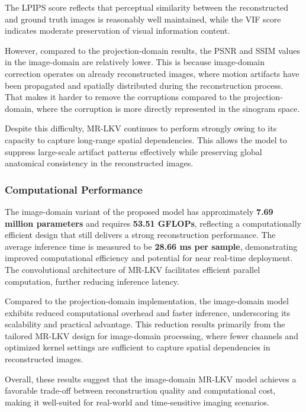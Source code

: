The LPIPS score reflects that perceptual similarity between the reconstructed and ground truth images is reasonably well maintained, while the VIF score indicates moderate preservation of visual information content.

However, compared to the projection-domain results, the PSNR and SSIM values in the image-domain are relatively lower. This is because image-domain correction operates on already reconstructed images, where motion artifacts have been propagated and spatially distributed during the reconstruction process. That makes it harder to remove the corruptions compared to the projection-domain, where the corruption is more directly represented in the sinogram space.

Despite this difficulty, MR-LKV continues to perform strongly owing to its capacity to capture long-range spatial dependencies. This allows the model to suppress large-scale artifact patterns effectively while preserving global anatomical consistency in the reconstructed images.

 

\subsubsection{Computational Performance}
The image-domain variant of the proposed model has approximately \textbf{7.69 million parameters} and requires \textbf{53.51 GFLOPs}, reflecting a computationally efficient design that still delivers a strong reconstruction performance. The average inference time is measured to be \textbf{28.66 ms per sample}, demonstrating improved computational efficiency and potential for near real-time deployment.  The convolutional architecture of MR-LKV facilitates efficient parallel computation, further reducing inference latency.


Compared to the projection-domain implementation, the image-domain model exhibits reduced computational overhead and faster inference, underscoring its scalability and practical advantage. This reduction results primarily from the tailored MR-LKV design for image-domain processing, where fewer channels and optimized kernel settings are sufficient to capture spatial dependencies in reconstructed images.

Overall, these results suggest that the image-domain MR-LKV model achieves a favorable trade-off between reconstruction quality and computational cost, making it well-suited for real-world and time-sensitive imaging scenarios.

